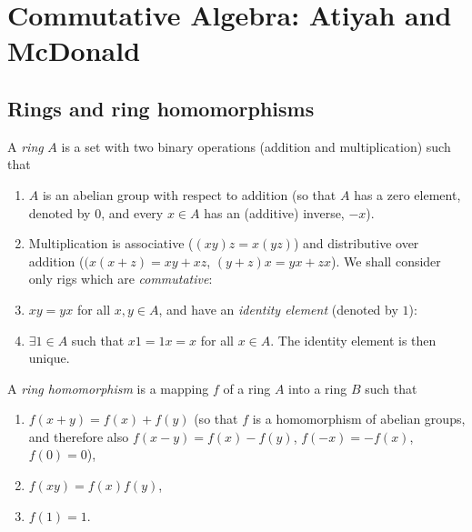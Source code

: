 \chapter{Commutative Algebra: Atiyah and McDonald}
\section{Rings and ring homomorphisms}
A \emph{ring} $A$ is a set with two binary operations (addition
and multiplication) such that
\begin{enumerate}[noitemsep,label=(\arabic*)]
\item $A$ is an abelian group with respect to addition (so that
  $A$ has a zero element, denoted by $0$, and every $x\in A$ has
  an (additive) inverse, $-x$).
\item Multiplication is associative ($(xy)z=x(yz)$) and
  distributive over addition ($(x(x+z)=xy+xz$,
  $(y+z)x=yx+zx$). We shall consider only rigs which are
  \emph{commutative}:
\item $xy=yx$ for all $x,y\in A$, and have an \emph{identity
    element} (denoted by $1$):
\item $\exists 1\in A$ such that $x1=1x=x$ for all $x\in A$. The
  identity element is then unique.
\end{enumerate}

A \emph{ring homomorphism} is a mapping $f$ of a ring $A$
into a ring $B$ such that
\begin{enumerate}[noitemsep,label=(\roman*)]
\item $f(x+y)=f(x)+f(y)$ (so that $f$ is a homomorphism of
  abelian groups, and therefore also $f(x-y)=f(x)-f(y)$,
  $f(-x)=-f(x)$, $f(0)=0$),
\item $f(xy)=f(x)f(y)$,
\item $f(1)=1$.
\end{enumerate}

